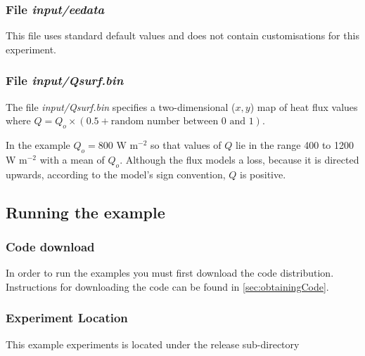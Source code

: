 \subsubsection{File {\it input/eedata}}

This file uses standard default values and does not contain
customisations for this experiment.


\subsubsection{File {\it input/Qsurf.bin}}

The file {\it input/Qsurf.bin} specifies a two-dimensional ($x,y$) 
map of heat flux values where 
$Q = Q_o \times ( 0.5 + \mbox{random number between 0 and 1})$.

In the example $Q_o = 800$ W m$^{-2}$ so that values of $Q$ lie in the range 400 to
1200 W m$^{-2}$ with a mean of $Q_o$. Although the flux models a loss, because it is
directed upwards, according to the model's sign convention, $Q$ is positive.


\begin{figure}
\begin{center}
\end{center}
\caption{
}
\label{fig:eg-bconv-Qsurf}
\end{figure}

\subsection{Running the example}

\subsubsection{Code download}

In order to run the examples you must first download the code distribution.
Instructions for downloading the code can be found in \ref{sec:obtainingCode}.

\subsubsection{Experiment Location}

 This example experiments is located under the release sub-directory

